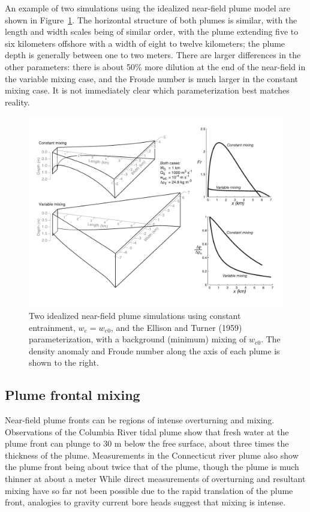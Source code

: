 \documentclass[12pt]{article}
\begin{document}
An example of two simulations using the idealized near-field plume model are shown in Figure~\ref{fig:plume3d_Fr_dr}. The horizontal structure of both plumes is similar, with the length and width scales being of similar order, with the plume extending five to six kilometers offshore with a width of eight to twelve kilometers; the plume depth is generally between one to two meters. There are larger differences in the other parameters: there is about 50\% more dilution at the end of the near-field in the variable mixing case, and the Froude number is much larger in the constant mixing case. It is not immediately clear which parameterization best matches reality.

\begin{figure}
    \centering
    \includegraphics[width=6.5in]{Figures/plume3d_Fr_dr.pdf}
    \caption{Two idealized near-field plume simulations using constant entrainment, $w_e=w_{e0}$, and the Ellison and Turner (1959) parameterization, with a background (minimum) mixing of $w_{e0}$. The density anomaly and Froude number along the axis of each plume is shown to the right.}
    \label{fig:plume3d_Fr_dr}
\end{figure}

\subsection{Plume frontal mixing}

Near-field plume fronts can be regions of intense overturning and mixing. Observations of the Columbia River tidal plume show that fresh water at the plume front can plunge to 30 m below the free surface, about three times the thickness of the plume. Measurements in the Connecticut river plume also show the plume front being about twice that of the plume, though the plume is much thinner at about a meter \citep{odonnell.ea:98} While direct measurements of overturning and resultant mixing have so far not been possible due to the rapid translation of the plume front, analogies to gravity current bore heads suggest that mixing is intense.
\end{document}
